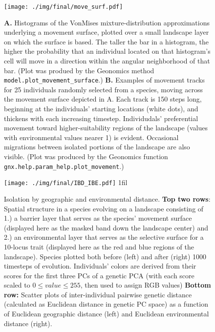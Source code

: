 ﻿\documentclass{article}
\makeatletter
\newcommand*{\centerfloat}{%
    \parindent \z@
    \leftskip \z@ \@plus 1fil \@minus \textwidth
    \rightskip\leftskip
    \parfillskip \z@skip}
\makeatother
\begin{document}
\begin{figure}[!hp]
\texttt{[image: ./img/final/move\_surf.pdf]}
        \caption{\textbf{A.} Histograms of the VonMises mixture-distribution approximations
                 underlying a movement surface, plotted over a small landscape
                 layer on which the surface is based.
                 The taller the bar in a histogram, the higher the probability
                 that an individual located on that histogram's cell will move
                 in a direction within the angular neighborhood of that bar.
                 (Plot was produed by the Geonomics method
                 \texttt{model.plot\_movement\_surface}.)
                 \textbf{B.} Examples of movement tracks for 25 individuals
                 randomly selected from a species, moving across
                 the movement surface depicted in A.
                 Each track is 150 steps long, beginning at
                 the individuals' starting locations (white dots),
                 and thickens with each increasing timestep.
                 Individudals' preferential movement toward
                 higher-suitability regions of the landscape
                 (values with environmental values nearer 1) is evident.
                 Occasional migrations between isolated portions of the
                 landscape are also visible.
                 (Plot was produced by the Geonomics function
                 \texttt{gnx.help.param\_help.plot\_movement}.)
                 }
        \label{fig:move_surf}
\end{figure}


\begin{figure}[!hp]
        \texttt{[image: ./img/final/IBD\_IBE.pdf]}
        \centerfloat
        \caption{Isolation by geographic and environmental distance. 
                 \textbf{Top two rows}: 
                 Spatial structure in a species evolving on a
                 landscape consisting of 1.) a barrier layer
                 that serves as the species' movement surface
                 (displayed here as the masked band down the landscape center)
                 and 2.) an environmental layer that serves as
                 the selective surface for a 10-locus trait
                 (displayed here as the red and blue regions of the landscape).
                 Species plotted both before (left)
                 and after (right) 1000 timesteps of evolution.
                 Individuals' colors are derived from their scores
                 for the first three PCs of a genetic PCA
                 (with each score scaled to $0\leq value\leq255$,
                 then used to assign RGB values)
                 \textbf{Bottom row:} 
                 Scatter plots of inter-individual pairwise genetic distance
                 (calculated as Euclidean distance in genetic PC space)
                 as a function of Euclidean geographic distance (left)
                 and Euclidean environmental distance (right).}
        \label{fig:IBD_IBE}
\end{figure}
\end{document}
